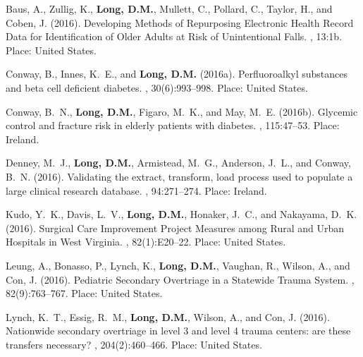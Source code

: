 \begin{thebibliography}{}
Baus, A., Zullig, K., \textbf{Long, D.M.}, Mullett, C., Pollard, C., Taylor, H., and
  Coben, J. (2016).
\newblock Developing {Methods} of {Repurposing} {Electronic} {Health} {Record}
  {Data} for {Identification} of {Older} {Adults} at {Risk} of {Unintentional}
  {Falls}.
, 13:1b.
\newblock Place: United States.

Conway, B., Innes, K.~E., and \textbf{Long, D.M.} (2016a).
\newblock Perfluoroalkyl substances and beta cell deficient diabetes.
, 30(6):993--998.
\newblock Place: United States.

Conway, B.~N., \textbf{Long, D.M.}, Figaro, M.~K., and May, M.~E. (2016b).
\newblock Glycemic control and fracture risk in elderly patients with diabetes.
, 115:47--53.
\newblock Place: Ireland.

Denney, M.~J., \textbf{Long, D.M.}, Armistead, M.~G., Anderson, J.~L., and Conway,
  B.~N. (2016).
\newblock Validating the extract, transform, load process used to populate a
  large clinical research database.
, 94:271--274.
\newblock Place: Ireland.


Kudo, Y.~K., Davis, L.~V., \textbf{Long, D.M.}, Honaker, J.~C., and Nakayama, D.~K.
  (2016).
\newblock Surgical {Care} {Improvement} {Project} {Measures} among {Rural} and
  {Urban} {Hospitals} in {West} {Virginia}.
, 82(1):E20--22.
\newblock Place: United States.

Leung, A., Bonasso, P., Lynch, K., \textbf{Long, D.M.}, Vaughan, R., Wilson, A., and Con,
  J. (2016).
\newblock Pediatric {Secondary} {Overtriage} in a {Statewide} {Trauma}
  {System}.
, 82(9):763--767.
\newblock Place: United States.

Lynch, K.~T., Essig, R.~M., \textbf{Long, D.M.}, Wilson, A., and Con, J. (2016).
\newblock Nationwide secondary overtriage in level 3 and level 4 trauma
  centers: are these transfers necessary?
, 204(2):460--466.
\newblock Place: United States.


\end{thebibliography}
